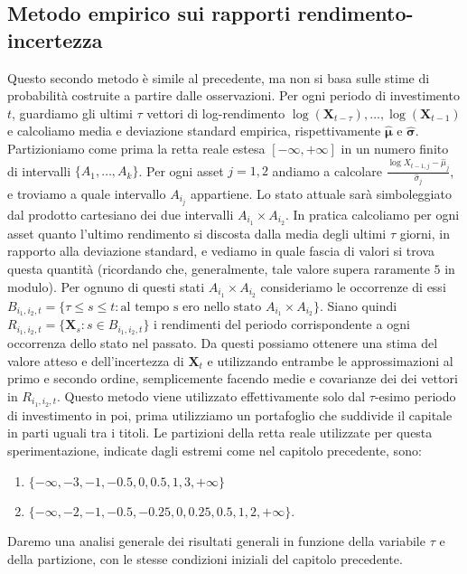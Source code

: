 \documentclass[a4paper,11pt]{book}
\theoremstyle{plain}
\theoremstyle{definition}
\theoremstyle{remark}
\newcommand{\X}{\bm{X}}
\begin{document}
\subsection{Metodo empirico sui rapporti rendimento-incertezza}
Questo secondo metodo è simile al precedente, ma non si basa sulle stime di probabilità costruite a partire dalle osservazioni. Per ogni periodo di investimento $t$, guardiamo gli ultimi $\tau$ vettori di log-rendimento $\log(\X_{t-\tau}),\ldots, \log(\X_{t-1})$ e calcoliamo media e deviazione standard empirica, rispettivamente $\hat{\bm{\mu}}$ e $\hat{\bm{\sigma}}$. \newline
Partizioniamo come prima la retta reale estesa $[-\infty,+\infty]$ in un numero finito di intervalli $\{A_1,\ldots, A_k\}$. Per ogni asset $j = 1,2$ andiamo a calcolare $\frac{\log X_{t-1,j}-\hat{\mu}_j}{\hat{\sigma}_j}$, e troviamo a quale intervallo $A_{i_j}$ appartiene. Lo stato attuale sarà simboleggiato dal prodotto cartesiano dei due intervalli $A_{i_1}\times A_{i_2}$.\newline
In pratica calcoliamo per ogni asset quanto l'ultimo rendimento si discosta dalla media degli ultimi $\tau$ giorni, in rapporto alla deviazione standard, e vediamo in quale fascia di valori si trova questa quantità (ricordando che, generalmente, tale valore supera raramente $5$ in modulo).\newline
Per ognuno di questi stati $A_{i_1}\times A_{i_2}$ consideriamo le occorrenze di essi $B_{i_1,i_2,t}=\{\tau \leq s\leq t: \text{al tempo s ero nello stato }A_{i_1}\times A_{i_2}\}$. Siano quindi $R_{i_1,i_2,t}=\{\X_s:s\in B_{i_1,i_2,t}\}$ i rendimenti del periodo corrispondente a ogni occorrenza dello stato nel passato. Da questi possiamo ottenere una stima del valore atteso e dell'incertezza di $\X_t$ e utilizzando entrambe le approssimazioni al primo e secondo ordine, semplicemente facendo medie e covarianze dei dei vettori in $R_{i_1,i_2,t}$.\newline
Questo metodo viene utilizzato effettivamente solo dal $\tau$-esimo periodo di investimento in poi, prima utilizziamo un portafoglio che suddivide il capitale in parti uguali tra i titoli.\newline
Le partizioni della retta reale utilizzate per questa sperimentazione, indicate dagli estremi come nel capitolo precedente, sono:
\begin{enumerate}
	\item $\{-\infty, -3, -1, -0.5, 0, 0.5, 1, 3, +\infty\}$
	\item $\{-\infty, -2, -1, -0.5, -0.25, 0, 0.25, 0.5, 1, 2, +\infty\}$.
\end{enumerate}
Daremo una analisi generale dei risultati generali in funzione della variabile $\tau$ e della partizione, con le stesse condizioni iniziali del capitolo precedente. 
\end{document}
